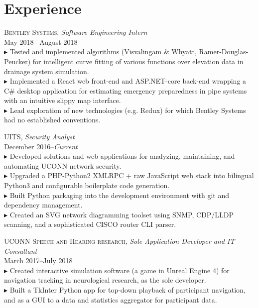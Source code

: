 \documentclass[Letterpaper,11pt]{article}
\newcommand{\bul}{$\blacktriangleright$ }
\begin{document}
\vspace{-1.5em} %
\section*{Experience}
\vspace{0.1em}

    \textsc{Bentley Systems},
    \textit{Software Engineering Intern}\\
    May 2018-- August 2018\\
        \bul Tested and implemented algorithms (Visvalingam \& Whyatt, Ramer-Douglas-Peucker) 
        for intelligent curve fitting of various functions over elevation data in 
        drainage system simulation.
        \\
        \bul Implemented a React web front-end and ASP.NET-core back-end wrapping a C\# desktop 
        application for estimating emergency preparedness in pipe systems with an intuitive 
        slippy map interface.
        \\
        \bul Lead exploration of new technologies (e.g. Redux) for which Bentley Systems
        had no established conventions.

    \textsc{UITS},
    \textit{Security Analyst}\\
    December 2016--\textit{Current}\\
        \bul Developed solutions and web applications for analyzing, maintaining, and automating UCONN network security.
        \\
        \bul Upgraded a PHP-Python2 XMLRPC + raw JavaScript web stack into bilingual Python3 
        and configurable boilerplate code generation.
        \\
        \bul Built Python packaging into the development environment with git and 
        dependency management.
        \\
        \bul Created an SVG network diagramming toolset using SNMP, CDP/LLDP scanning, 
        and a sophisticated CISCO router CLI parser.

    \textsc{UCONN Speech and Hearing research},
    \textit{Sole Application Developer and IT Consultant}\\
    March 2017--July 2018\\
        \bul Created interactive simulation software (a game in Unreal Engine 4) 
        for navigation tracking in neurological research, as the sole developer.
        \\
        \bul Built a TkInter Python app for top-down playback of participant navigation,
        and as a GUI to a data and statistics aggregator for participant data.
        
\end{document}
